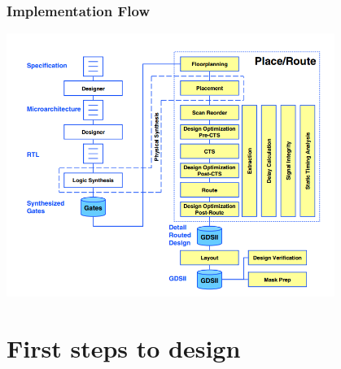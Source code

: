 \documentclass[compress]{beamer}
\begin{document}
\begin{frame}
	\frametitle{Implementation Flow}
	\begin{center}
		\includegraphics[width=0.8\textwidth]{PnR}
	\end{center}
\end{frame}	

\section[First]{First steps to design}
\end{document}
